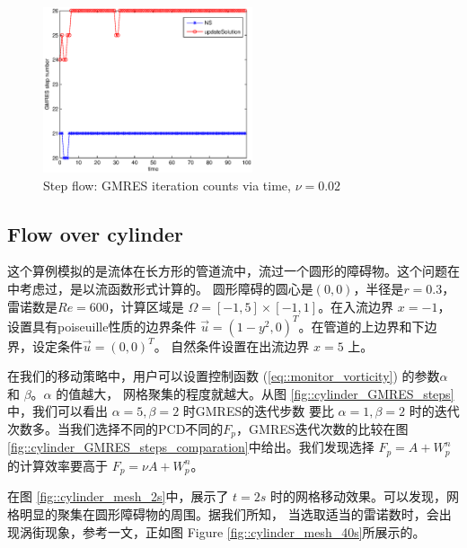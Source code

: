       \begin{figure}[!htbp]
        \centering
        \includegraphics[width = 0.55\textwidth, angle = 0]{picture/second/L_shaped_flow_data/iterate_steps.eps}
        \caption{\small Step flow: GMRES iteration counts via time, $\nu = 0.02$}
        \label{fig::GMRES_steps_total}
      \end{figure}

   \subsection{Flow over cylinder}

      这个算例模拟的是流体在长方形的管道流中，流过一个圆形的障碍物。这个问题在\cite{cao1999anr}中考虑过，是以流函数形式计算的。
      圆形障碍的圆心是$(0, 0)$，半径是$r = 0.3$，雷诺数是$Re = 600$，计算区域是 $\Omega = [-1, 5] \times [-1, 1]$。在入流边界
      $x = -1$，设置具有poiseuille性质的边界条件 $\vec{u} = (1 - y^2, 0)^T$。在管道的上边界和下边界，设定条件$\vec{u} = (0, 0)^T$。
      自然条件设置在出流边界 $x = 5$ 上。

      在我们的移动策略中，用户可以设置控制函数 (\ref{eq::monitor_vorticity}) 的参数$\alpha$ 和 $\beta$。$\alpha$ 的值越大，
      网格聚集的程度就越大。从图 \ref{fig::cylinder_GMRES_steps}中，我们可以看出 $\alpha = 5, \beta = 2$ 时GMRES的迭代步数
      要比 $\alpha = 1, \beta = 2$ 时的迭代次数多。当我们选择不同的PCD不同的$F_p$，GMRES迭代次数的比较在图 \ref{fig::cylinder_GMRES_steps_comparation}中给出。我们发现选择 $F_p = A + W_p^n$ 的计算效率要高于 $F_p = \nu A + W_p^n$。

      在图 \ref{fig::cylinder_mesh_2s}中，展示了 $t = 2s$ 时的网格移动效果。可以发现，网格明显的聚集在圆形障碍物的周围。据我们所知，
      当选取适当的雷诺数时，会出现涡街现象，参考\cite{milton1982album}一文，正如图 Figure \ref{fig::cylinder_mesh_40s}所展示的。

